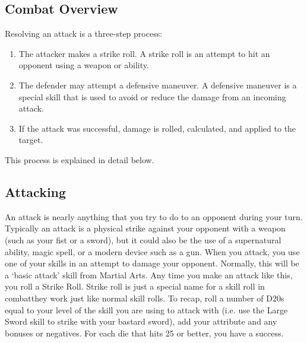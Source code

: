 \documentclass[twoside]{book}
\begin{document}
\subsection{Combat Overview}
     Resolving an attack is a three-step process: 
\begin{enumerate}
      
  \item   
                   The attacker makes a strike roll. A strike roll
                   is an attempt to hit an opponent using a weapon or
                   ability. 
              
  \item   
                   The defender may attempt a defensive maneuver. A
                   defensive maneuver is a special skill that is used to
                   avoid or reduce the damage from an incoming attack.
                   
              
  \item   
                   If the attack was successful, damage is rolled,
                   calculated, and applied to the target. 
              
\end{enumerate}
   This process is explained in detail below. 
    

\subsection{Attacking}
     An attack is nearly anything that you try to do to
               an opponent during your turn. Typically an attack is a
               physical strike against your opponent with a weapon (such
               as your fist or a sword), but it could also be the use of
               a supernatural ability, magic spell, or a modern device
               such as a gun.  When you attack, you use one of your skills in an
              attempt to damage your opponent. Normally, this will be a
              `basic attack' skill from Martial Arts. Any
              time you make an attack like this, you roll a Strike Roll.
              Strike roll is just a special name for a skill roll in
              combatthey work just like normal skill rolls. To
              recap, roll a number of D20s equal to your level of the
              skill you are using to attack with (i.e. use the Large
              Sword skill to strike with your bastard sword), add your
              attribute and any bonuses or negatives. For each die that
              hits 25 or better, you have a success.
               
\end{document}
